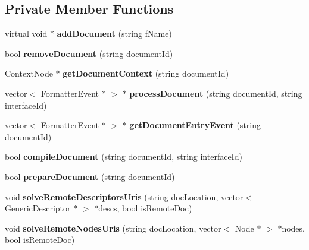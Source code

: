 \subsection*{Private Member Functions}
\begin{CompactItemize}
\item 
virtual void $\ast$ \textbf{addDocument} (string fName)\label{classbr_1_1pucrio_1_1telemidia_1_1ginga_1_1ncl_1_1FormatterMediator_2f817ec6e0a0958c0344120170f44683}

\item 
bool \textbf{removeDocument} (string documentId)\label{classbr_1_1pucrio_1_1telemidia_1_1ginga_1_1ncl_1_1FormatterMediator_1555ee32add0ef9ec5f9ef4c50ad1197}

\item 
ContextNode $\ast$ \textbf{getDocumentContext} (string documentId)\label{classbr_1_1pucrio_1_1telemidia_1_1ginga_1_1ncl_1_1FormatterMediator_300d50e443e5258b1da02904011b5a1c}

\item 
vector$<$ FormatterEvent $\ast$ $>$ $\ast$ \textbf{processDocument} (string documentId, string interfaceId)\label{classbr_1_1pucrio_1_1telemidia_1_1ginga_1_1ncl_1_1FormatterMediator_a839dcc1deb97f7a13cc131e9218b5b4}

\item 
vector$<$ FormatterEvent $\ast$ $>$ $\ast$ \textbf{getDocumentEntryEvent} (string documentId)\label{classbr_1_1pucrio_1_1telemidia_1_1ginga_1_1ncl_1_1FormatterMediator_3eae681b81104f163aa989bdd741234c}

\item 
bool \textbf{compileDocument} (string documentId, string interfaceId)\label{classbr_1_1pucrio_1_1telemidia_1_1ginga_1_1ncl_1_1FormatterMediator_344af6e6eb07b2040f34f8d30651e055}

\item 
bool \textbf{prepareDocument} (string documentId)\label{classbr_1_1pucrio_1_1telemidia_1_1ginga_1_1ncl_1_1FormatterMediator_d2d67bcf3f41d0e95dec6cdf21478060}

\item 
void \textbf{solveRemoteDescriptorsUris} (string docLocation, vector$<$ GenericDescriptor $\ast$ $>$ $\ast$descs, bool isRemoteDoc)\label{classbr_1_1pucrio_1_1telemidia_1_1ginga_1_1ncl_1_1FormatterMediator_facd4e379ab68514abd90256649b9413}

\item 
void \textbf{solveRemoteNodesUris} (string docLocation, vector$<$ Node $\ast$ $>$ $\ast$nodes, bool isRemoteDoc)\label{classbr_1_1pucrio_1_1telemidia_1_1ginga_1_1ncl_1_1FormatterMediator_c9c4a0ac656e8619d9ba42a5416c8943}


\end{CompactItemize}
